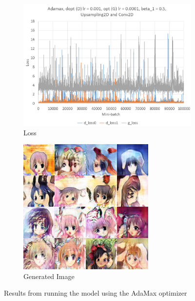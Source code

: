 \documentclass{article} %
\begin{document}
\begin{figure}[h!]
	\centering
	\begin{subfigure}[b]{0.5\linewidth}
		\includegraphics[width=\linewidth]{rclui-07-Adamax.png}
		\caption{Loss}
		\label{fig:kerasAdamax07Loss}
	\end{subfigure}
	\begin{subfigure}[b]{0.35\linewidth}
		\includegraphics[width=\linewidth]{rclui-07-Adamax-gen.png}
		\caption{Generated Image}
		\label{fig:kerasAdamax07Gen}
	\end{subfigure}
	\caption{Results from running the model using the AdaMax optimizer}
	\label{fig:kerasAdamax07}
\end{figure}
\end{document}
